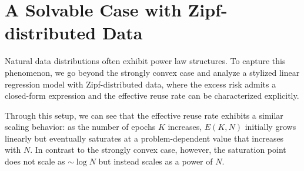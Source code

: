 \vspace{-0.07in}
\section{A Solvable Case with Zipf-distributed Data}
\label{sec:one_hot}

Natural data distributions often exhibit power law structures. To capture this phenomenon, we go beyond the strongly convex case and analyze a stylized linear regression model with Zipf-distributed data, where the excess risk admits a closed-form expression and the effective reuse rate can be characterized explicitly.

Through this setup, we can see that the effective reuse rate exhibits a similar scaling behavior: 
as the number of epochs $K$ increases, 
$E(K,N)$ initially grows linearly but eventually saturates at a problem-dependent value that increases with $N$. In contrast to the strongly convex case, however, the saturation point does not scale as $\sim \log N$ but instead scales as a power of $N$.

